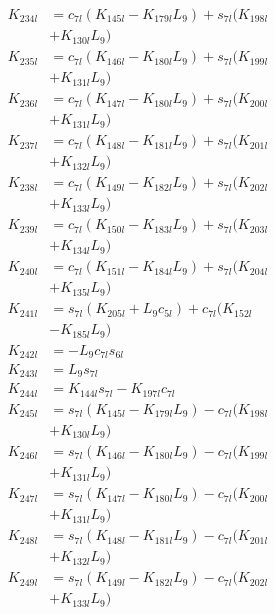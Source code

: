 \begin{align}
K_{234l} &= c_{7l}(K_{145l} - K_{179l}L_9) + s_{7l}(K_{198l}  \nonumber \\
&+ K_{130l}L_9) \nonumber \\
K_{235l} &= c_{7l}(K_{146l} - K_{180l}L_9) + s_{7l}(K_{199l}  \nonumber \\
&+ K_{131l}L_9) \nonumber \\
K_{236l} &= c_{7l}(K_{147l} - K_{180l}L_9) + s_{7l}(K_{200l}  \nonumber \\
&+ K_{131l}L_9) \nonumber \\
K_{237l} &= c_{7l}(K_{148l} - K_{181l}L_9) + s_{7l}(K_{201l}  \nonumber \\
&+ K_{132l}L_9) \nonumber \\
K_{238l} &= c_{7l}(K_{149l} - K_{182l}L_9) + s_{7l}(K_{202l}  \nonumber \\
&+ K_{133l}L_9) \nonumber \\
K_{239l} &= c_{7l}(K_{150l} - K_{183l}L_9) + s_{7l}(K_{203l}  \nonumber \\
&+ K_{134l}L_9) \nonumber \\
K_{240l} &= c_{7l}(K_{151l} - K_{184l}L_9) + s_{7l}(K_{204l}  \nonumber \\
&+ K_{135l}L_9) \nonumber \\
K_{241l} &= s_{7l}(K_{205l} + L_9c_{5l}) + c_{7l}(K_{152l}  \nonumber \\
&- K_{185l}L_9) \nonumber \\
K_{242l} &= -L_9c_{7l}s_{6l} \nonumber \\
K_{243l} &= L_9s_{7l} \nonumber \\
K_{244l} &= K_{144l}s_{7l} - K_{197l}c_{7l} \nonumber \\
K_{245l} &= s_{7l}(K_{145l} - K_{179l}L_9) - c_{7l}(K_{198l}  \nonumber \\
&+ K_{130l}L_9) \nonumber \\
K_{246l} &= s_{7l}(K_{146l} - K_{180l}L_9) - c_{7l}(K_{199l}  \nonumber \\
&+ K_{131l}L_9) \nonumber \\
K_{247l} &= s_{7l}(K_{147l} - K_{180l}L_9) - c_{7l}(K_{200l}  \nonumber \\
&+ K_{131l}L_9) \nonumber \\
K_{248l} &= s_{7l}(K_{148l} - K_{181l}L_9) - c_{7l}(K_{201l}  \nonumber \\
&+ K_{132l}L_9) \nonumber \\
K_{249l} &= s_{7l}(K_{149l} - K_{182l}L_9) - c_{7l}(K_{202l}  \nonumber \\
&+ K_{133l}L_9) \nonumber \\

\end{align}
